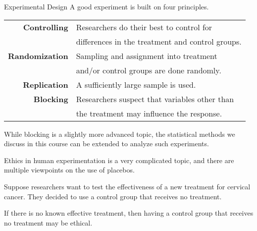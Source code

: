 \documentclass{beamer}
\begin{document}
\begin{frame}
\begin{block}{Experimental Design}
A good experiment is built on four principles.

\begin{tabular}{rl}
\textbf{Controlling} & Researchers do their best to control for\\
& differences in the treatment and control groups. \\
\textbf{Randomization} & Sampling and assignment into treatment \\
& and/or control groups are done randomly. \\
\textbf{Replication} & A sufficiently large sample is used. \\
\textbf{Blocking} & Researchers suspect that variables other than \\
& the treatment may influence the response.
\end{tabular}
\end{block}\pause

\begin{note}
While blocking is a slightly more advanced topic, the statistical methods we discuss in this course can be extended to analyze such experiments.
\end{note}
\end{frame}

\begin{frame}
\begin{note}
Ethics in human experimentation is a very complicated topic, and there are multiple viewpoints on the use of placebos.
\end{note}\pause

\begin{example}
Suppose researchers want to test the effectiveness of a new treatment for cervical cancer. They decided to use a control group that receives no treatment.

\vspace{1mm}
\pause
{}
\end{example}\pause

\begin{note}
If there is no known effective treatment, then having a control group that receives no treatment may be ethical.
\end{note}\pause
\end{frame}
\end{document}
